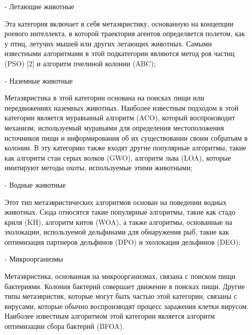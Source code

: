         \begin{itemize}
            \item[-] Летающие животные
            
            Эта категория включает в себя метаэвристику, основанную на 
            концепции роевого интеллекта, в которой траектория агентов 
            определяется полетом, как у птиц, летучих мышей или других 
            летающих животных. Самыми известными алгоритмами в этой 
            подкатегории являются метод роя частиц (PSO) [2] и алгоритм пчелиной 
            колонии (ABC);

            \item[-] Наземные животные
            
            Метаэвристика в этой категории основана на поисках пищи или 
            передвижениях наземных животных. Наиболее известным подходом в 
            этой категории является муравьиный алгоритм (ACO), 
            который воспроизводит механизм, используемый муравьями для 
            определения местоположения источников пищи и 
            информирования об их существовании своим собратьям в колонии. 
            В эту категорию также входят другие популярные алгоритмы, такие 
            как алгоритм стаи серых волков (GWO), алгоритм льва (LOA), 
            которые имитируют методы охоты, используемые этими животными;
            
            \item[-] Водные животные
            
            Этот тип метаэвристических алгоритмов основан на поведении водных животных. 
            Сюда относятся такие популярные алгоритмы, такие как 
            стадо криля (KH), алгоритм китов (WOA), а также алгоритмы, 
            основанные на эхолокации, используемой дельфинами для обнаружения рыб, 
            такие как оптимизация партнеров дельфинов (DPO) и эхолокация дельфинов (DEO);

            \item[-] Микроорганизмы
            
            Метаэвристика, основанная на микроорганизмах, связана с поиском пищи 
            бактериями. Колония бактерий совершает движение в поисках пищи. Другие 
            типы метаэвристик, которые могут быть частью этой категории, 
            связаны с вирусами, которые обычно воспроизводят процесс заражения клетки 
            вирусом. Наиболее известным алгоритмом этой категории является алгоритм 
            оптимизации сбора бактерий (BFOA).

        \end{itemize}
    

